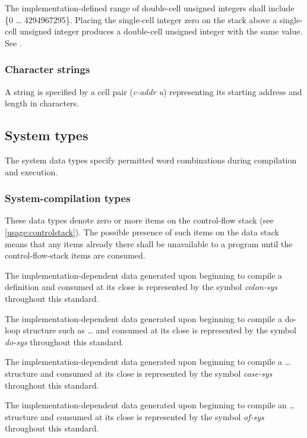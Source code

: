 The implementation-defined range of double-cell unsigned integers
shall include \{0 {\ldots} 4294967295\}. Placing the single-cell
integer zero on the stack above a single-cell unsigned integer
produces a double-cell unsigned integer with the same value.
See .

\subsubsection{Character strings} %

A string is specified by a cell pair (\emph{c-addr u}) representing
its starting address and length in characters.

\subsection{System types} %

The system data types specify permitted word combinations during
compilation and execution.

\subsubsection{System-compilation types} %

These data types denote zero or more items on the control-flow stack
(see \ref{usage:controlstack}). The possible presence of such items
on the data stack means that any items already there shall be
unavailable to a program until the control-flow-stack items are
consumed.

The implementation-dependent data generated upon beginning to compile
a definition and consumed at its close is represented by the symbol
\emph{colon-sys} throughout this standard.

The implementation-dependent data generated upon beginning to
compile a do-loop structure such as  {\ldots} 
and consumed at its close is represented by the symbol \emph{do-sys}
throughout this standard.

The implementation-dependent data generated upon beginning to
compile a  {\ldots}  structure and consumed
at its close is represented by the symbol \emph{case-sys} throughout
this standard.

The implementation-dependent data generated upon beginning to
compile an  {\ldots}  structure and consumed
at its close is represented by the symbol \emph{of-sys} throughout
this standard.

